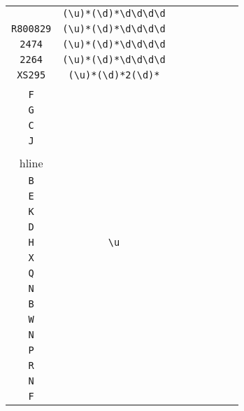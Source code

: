\begin{longtable}{cccccccc}
\begin{tabular}{ll}
    \verb|20296| & \verb|(\u)*(\d)*\d\d\d\d|\\
\verb|R800829| & \verb|(\u)*(\d)*\d\d\d\d|\\
\verb|2474| & \verb|(\u)*(\d)*\d\d\d\d|\\
\verb|2264| & \verb|(\u)*(\d)*\d\d\d\d|\\
\verb|XS295| & \verb|(\u)*(\d)*2(\d)*|
\end{tabular}
\\\midrule 
\begin{tabular}{l}
    \verb|I|\\
\verb|F|\\
\verb|G|\\
\verb|C|\\
\verb|J|\\
\\hline\\
\verb|B|\\
\verb|E|\\
\verb|K|\\
\verb|D|\\
\verb|H|
\end{tabular}

&
\verb|\u|
&

\begin{tabular}{l}
    \verb|\u|\\
\verb|X|\\
\verb|Q|\\
\verb|N|\\
\verb|B|\\
\verb|W|
\end{tabular}

&

\begin{tabular}{l}
    \verb|\u|\\
\verb|N|\\
\verb|P|\\
\verb|R|\\
\verb|N|\\
\verb|F|
\end{tabular}

&


\end{longtable}
